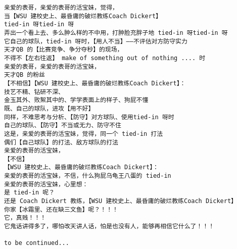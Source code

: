 \documentclass[9pt, b5paper]{article}
\begin{document}
\begin{verbatim}
亲爱的表哥，亲爱的表哥的活宝妹，觉得，
当【WSU 建校史上、最昏庸的破烂教练Coach Dickert】
tied-in 呀tied-in 呀
弄出一个看上去、多么肿么样的不中用，打肿脸充胖子地 tied-in 呀tied-in 呀
它自己的球队，tied-in 呀时，【用人不当】——不评估对方防守实力
天才QB 的【比赛竞争、争分夺秒】的现场，
不得不【左右往返】 make of something out of nothing .... 时
亲爱的表哥，亲爱的表哥的活宝妹，
天才QB 的粉丝
【不相信】【WSU 建校史上、最昏庸的破烂教练Coach Dickert】：
技艺不精、钻研不深、
金玉其外、败絮其中的、学学表面上的样子、狗屁不懂
既、自己的球队，进攻【用不好】
同样，不难思考与分析、【防守】对方球队、使用tied-in 呀时
自己的球队、【防守】不当或无力、防守不住
这是，亲爱的表哥的活宝妹，觉得，同一个 tied-in 打法
偶们【自己球队】的打法、敌方球队的打法
亲爱的表哥的活宝妹，
【不信】
【WSU 建校史上、最昏庸的破烂教练Coach Dickert】：
亲爱的表哥的活宝妹，不信，什么狗屁乌龟王八蛋的 tied-in
亲爱的表哥的活宝妹，心里想：
是 tied-in 呢？
还是 Coach Dickert 教练，【WSU 建校史上、最昏庸的破烂教练Coach Dickert】
你家【冰霜里、还在缺三文鱼】呢？！！！
它，真贱！！！
它鬼话讲得多了，哪怕改天讲人话，怕是也没有人，能够再相信它什么了！！！

to be continued...
\end{verbatim}
\end{document}
